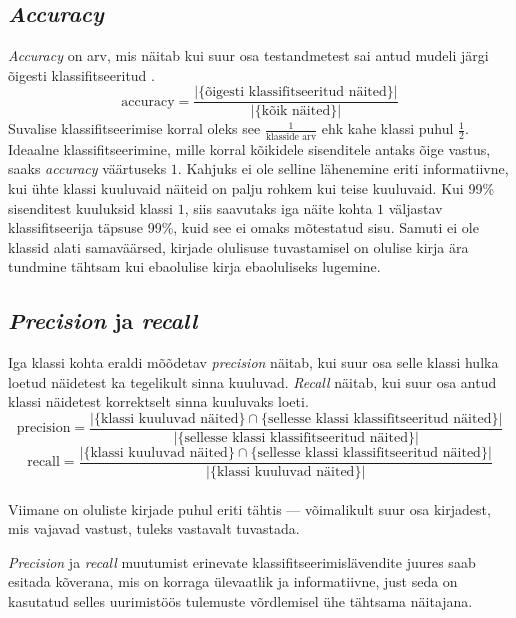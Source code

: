 \documentclass[]{trkuur}
\let\eng\emph
\begin{document}
\subsection{\emph{Accuracy}}
\eng{Accuracy} on arv, mis näitab kui suur osa testandmetest sai antud mudeli järgi
õigesti klassifitseeritud \autocite{wiki-accuracy}.
\[ \text{accuracy}=\frac{|\{\text{õigesti klassifitseeritud näited}\}|}{|\{\text{kõik näited}\}|} \]
Suvalise klassifitseerimise korral oleks see \(\frac{1}{\text{klasside arv}} \)
ehk kahe klassi puhul \( \frac{1}{2} \).
\autocite{SXrandClassif}
Ideaalne klassifitseerimine, mille korral kõikidele sisenditele antaks õige vastus, saaks \eng{accuracy} väärtuseks \( 1 \).
Kahjuks ei ole selline lähenemine eriti informatiivne, kui ühte klassi kuuluvaid
näiteid on palju rohkem kui teise kuuluvaid. Kui 99\% sisenditest kuuluksid
klassi \( 1 \), siis saavutaks iga näite kohta \( 1 \) väljastav
klassifitseerija täpsuse 99\%, kuid see ei omaks mõtestatud sisu. Samuti ei ole
klassid alati samaväärsed, kirjade olulisuse tuvastamisel on olulise kirja ära
tundmine tähtsam kui ebaolulise kirja ebaoluliseks lugemine.

\subsection{\emph{Precision} ja \emph{recall}}
Iga klassi kohta eraldi mõõdetav \eng{precision} näitab, kui suur osa selle klassi
hulka loetud näidetest ka tegelikult sinna kuuluvad. \eng{Recall} näitab, kui suur osa
antud klassi näidetest korrektselt sinna kuuluvaks loeti.
\[ \text{precision}=\frac{|\{\text{klassi kuuluvad näited}\}\cap\{\text{sellesse
klassi klassifitseeritud näited}\}|}{|\{\text{sellesse klassi klassifitseeritud
näited}\}|} \]
\[ \text{recall}=\frac{|\{\text{klassi kuuluvad näited}\}\cap\{\text{sellesse
klassi klassifitseeritud näited}\}|}{|\{\text{klassi kuuluvad näited}\}|} \]
\autocite{wiki-precision-and-recall} \\
Viimane on oluliste kirjade puhul eriti tähtis --- võimalikult suur osa kirjadest,
mis vajavad vastust, tuleks vastavalt tuvastada.

\eng{Precision} ja \eng{recall} muutumist erinevate
klassifitseerimislävendite juures saab esitada kõverana, mis on korraga
ülevaatlik ja informatiivne, just seda on kasutatud selles uurimistöös tulemuste
võrdlemisel ühe tähtsama näitajana.
\end{document}
